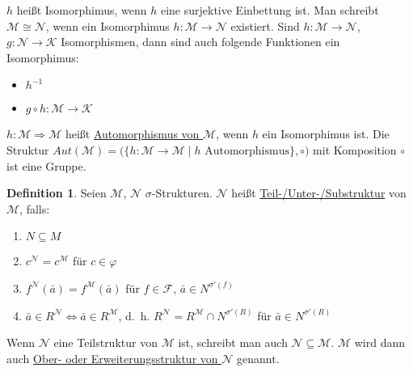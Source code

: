 \documentclass{article}
\theoremstyle{definition}
\newtheorem{dfn}{Definition}
\newcommand{\calF}{\mathcal{F}}
\newcommand{\calK}{\mathcal{K}}
\newcommand{\calM}{\mathcal{M}}
\newcommand{\calN}{\mathcal{N}}
\begin{document}
    $ h $ heißt Isomorphimus, wenn $ h $ eine surjektive Einbettung ist.
    Man schreibt $ \calM \cong \calN $, wenn ein Isomorphimus $ h : \calM \rightarrow \calN $ existiert.
    Sind $ h : \calM \rightarrow \calN $, $ g : \calN \rightarrow \calK $ Isomorphismen, dann sind auch folgende Funktionen ein Isomorphimus:
    \begin{itemize}
        \item $ h^{-1} $
        \item $ g \circ h : \calM \rightarrow \calK $
    \end{itemize}

    $ h : \calM \Rightarrow \calM $ heißt \underline{Automorphismus von $ \calM $}, wenn $ h $ ein Isomorphimus ist.
    Die Struktur $ Aut(\calM) = \big( \{ h : \calM \rightarrow \calM \mid h \text{ Automorphismus} \}, \circ \big) $ mit Komposition $ \circ $ ist eine Gruppe.

    \begin{dfn}
        Seien $ \calM $, $ \calN $ $\sigma $-Strukturen.
        $ \calN $ heißt \underline{Teil-/Unter-/Substruktur} von $ \calM $, falls:
        \begin{enumerate}
            \item $ N \subseteq M $
            \item $ c^\calN = c^\calM $ für $ c \in \varphi $
            \item $ f^\calN(\bar{a}) = f^\calM(\bar{a}) $ für $ f \in \calF $, $ \bar{a} \in N^{\sigma'(f)} $
            \item $ \bar{a} \in R^\calN \Leftrightarrow \bar{a} \in R^\calM $, d.~h. $ R^\calN = R^\calM \cap N^{\sigma'(R)} $ für $ \bar{a} \in N^{\sigma'(R)} $
        \end{enumerate}
    \end{dfn}

    Wenn $ \calN $ eine Teilstruktur von $ \calM $ ist, schreibt man auch $ \calN \subseteq \calM $.
    $ \calM $ wird dann auch \underline{Ober- oder Erweiterungsstruktur von $ \calN $} genannt.
\end{document}
